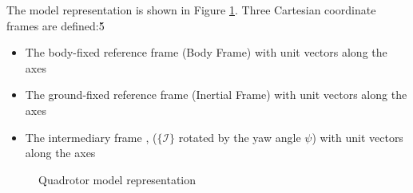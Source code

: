 The  model representation is shown in Figure \ref{fig:mod.model}. Three Cartesian coordinate frames are defined:\v{5}
\begin{itemize}
	\setlength\itemsep{.2pt}
	\item The body-fixed reference frame  (Body Frame)
	\subitem with unit vectors  along the axes
	\item The ground-fixed reference frame  (Inertial Frame)
	\subitem with unit vectors  along the axes								
	\item The intermediary frame , ($ \{\mathcal{I} \}$ rotated by the yaw angle $ \psi $) 
	\subitem with unit vectors  along the axes								
\end{itemize}

\begin{figure}[h!]
	\centering
	\caption{Quadrotor model representation\label{fig:mod.model}}
\end{figure}	

